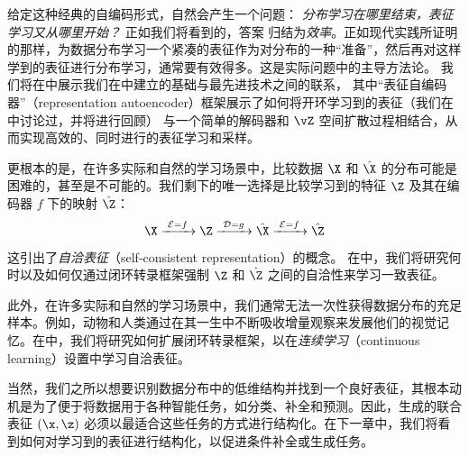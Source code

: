 \documentclass[../../book-main_zh.tex]{subfiles}
\begin{document}
给定这种经典的自编码形式，自然会产生一个问题：
\textit{分布学习在哪里结束，表征学习又从哪里开始？}
正如我们将看到的，答案 %
归结为\textit{效率}。正如现代实践所证明的那样，为数据分布学习一个紧凑的表征作为对分布的一种“准备”，然后再对这样学到的表征进行分布学习，通常要有效得多。这是实际问题中的主导方法论。
我们将在中展示我们在中建立的基础与最先进技术之间的联系，
其中“表征自编码器”（representation autoencoder）框架展示了如何将开环学习到的表征（我们在中讨论过，并将进行回顾）
与一个简单的解码器和 $\vZ$ 空间扩散过程相结合，从而实现高效的、同时进行的表征学习和采样。

更根本的是，在许多实际和自然的学习场景中，比较数据 $\X$ 和 $\hat \X$ 的分布可能是困难的，甚至是不可能的。我们剩下的唯一选择是比较学习到的特征 $\Z$ 及其在编码器 $f$ 下的映射 $\hat \Z$：
\begin{equation}
    \X
    \xrightarrow{\hspace{1mm} \mathcal{E} = f \hspace{1mm}} \Z
    \xrightarrow{\hspace{1mm} \mathcal{D} = g \hspace{1mm}} \hat{\X}
    \xrightarrow{\hspace{1mm} \mathcal{E} = f \hspace{1mm}} \hat \Z
\end{equation}
这引出了{\em 自洽表征}（self-consistent representation）的概念。
在中，我们将研究何时以及如何仅通过闭环转录框架强制 $\Z$ 和 $\hat \Z$ 之间的自洽性来学习一致表征。

此外，在许多实际和自然的学习场景中，我们通常无法一次性获得数据分布的充足样本。例如，动物和人类通过在其一生中不断吸收增量观察来发展他们的视觉记忆。在中，我们将研究如何扩展闭环转录框架，以在{\em 连续学习}（continuous learning）设置中学习自洽表征。

当然，我们之所以想要识别数据分布中的低维结构并找到一个良好表征，其根本动机是为了便于将数据用于各种智能任务，如分类、补全和预测。因此，生成的联合表征 $(\x, \z)$ 必须以最适合这些任务的方式进行结构化。在下一章中，我们将看到如何对学习到的表征进行结构化，以促进条件补全或生成任务。
\end{document}
